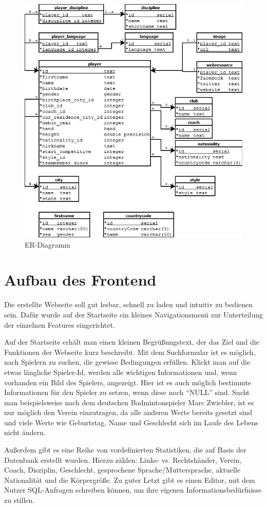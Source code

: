 \begin{figure}[H]
\centering
\includegraphics[width=1\textwidth]{images/ER-Diagramm} 
\caption{ER-Diagramm}
\label{fig:ER-Diagramm}
\end{figure}
\newpage

\section{Aufbau des Frontend}
\label{Frontend}
Die erstellte Webseite soll gut lesbar, schnell zu laden und intuitiv zu bedienen sein. Dafür wurde auf der Startseite ein kleines Navigationsmenü zur Unterteilung der einzelnen Features eingerichtet. \newline

Auf der Startseite erhält man einen kleinen Begrüßungstext, der das Ziel und die Funktionen der Webseite kurz beschreibt. Mit dem Suchformular ist es möglich, nach Spielern zu suchen, die gewisse Bedingungen erfüllen. Klickt man auf die etwas längliche Spieler-Id, werden alle wichtigen Informationen und, wenn vorhanden ein Bild des Spielers, angezeigt. Hier ist es auch möglich bestimmte Informationen für den Spieler zu setzen, wenn diese noch "`NULL"' sind. Sucht man beispielsweise nach dem deutschen Badmintonspieler Marc Zwiebler, ist es nur möglich den Verein einzutragen, da alle anderen Werte bereits gesetzt sind und viele Werte wie Geburtstag, Name und Geschlecht sich im Laufe des Lebens nicht ändern. \newline

Außerdem gibt es eine Reihe von vordefinierten Statistiken, die auf Basis der Datenbank erstellt wurden. Hierzu zählen:
Links- vs. Rechtshänder, Verein, Coach, Disziplin, Geschlecht, gesprochene Sprache/Muttersprache, aktuelle Nationalität und die Körpergröße. Zu guter Letzt gibt es einen Editor, mit dem Nutzer SQL-Anfragen schreiben können, um ihre eigenen Informationsbedürfnisse zu stillen.